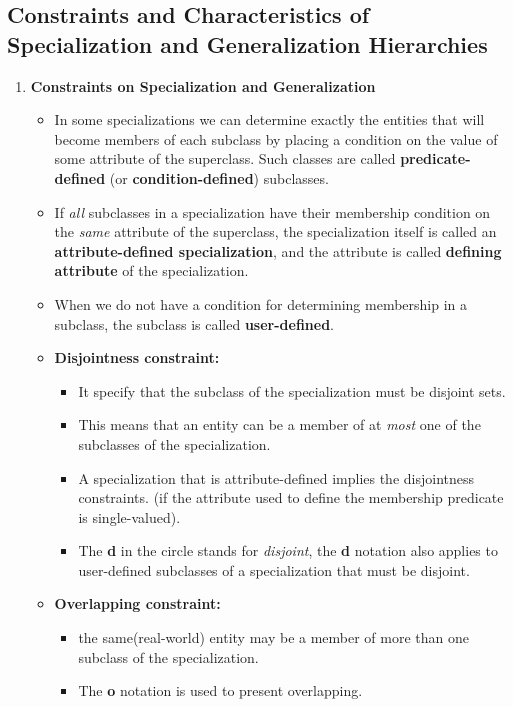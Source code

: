 \documentclass[10pt]{article}
\newcommand{\tf}{\textbf}
\newcommand{\ti}{\textit}
\begin{document}
\subsection{Constraints and Characteristics of Specialization and Generalization Hierarchies}

\begin{enumerate}
	\item \tf{Constraints on Specialization and Generalization}
	\begin{itemize}
		\item In some specializations we can determine exactly the entities that will become members of each subclass by placing a condition on the value of some attribute of the superclass. Such classes are called \tf{predicate-defined} (or \tf{condition-defined}) subclasses.
		\item If \ti{all} subclasses in a specialization have their membership condition on the \ti{same} attribute of the superclass, the specialization itself is called an \tf{attribute-defined specialization}, and the attribute is called \tf{defining attribute} of the specialization.
		\item When we do not have a condition for determining membership in a subclass, the subclass is called \tf{user-defined}.
		\item \tf{Disjointness constraint: } 
		\begin{itemize}
			\item It specify that the subclass of the specialization must be disjoint sets.
			\item This means that an entity can be a member of at \ti{most} one of the subclasses of the specialization.
			\item A specialization that is attribute-defined implies the disjointness constraints. (if the attribute used to define the membership predicate is single-valued).
			\item The \tf{d} in the circle stands for \ti{disjoint}, the \tf{d} notation also applies to user-defined subclasses of a specialization that must be disjoint. 
		\end{itemize}
		\item \tf{Overlapping constraint: } 
		\begin{itemize}
			\item the same(real-world) entity may be a member of more than one subclass of the specialization.
			\item The \tf{o} notation is used to present overlapping.
		\end{itemize}


\end{itemize}
\end{enumerate}
\end{document}
